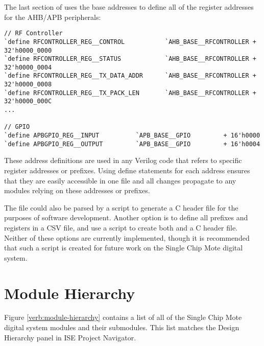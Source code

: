 The last section of  uses the base addresses to define all of the register addresses for the AHB/APB peripherals:

\begin{lstlisting}
// RF Controller
`define RFCONTROLLER_REG__CONTROL           `AHB_BASE__RFCONTROLLER + 32'h0000_0000
`define RFCONTROLLER_REG__STATUS            `AHB_BASE__RFCONTROLLER + 32'h0000_0004
`define RFCONTROLLER_REG__TX_DATA_ADDR      `AHB_BASE__RFCONTROLLER + 32'h0000_0008
`define RFCONTROLLER_REG__TX_PACK_LEN       `AHB_BASE__RFCONTROLLER + 32'h0000_000C
...

// GPIO
`define APBGPIO_REG__INPUT          `APB_BASE__GPIO         + 16'h0000
`define APBGPIO_REG__OUTPUT         `APB_BASE__GPIO         + 16'h0004

\end{lstlisting}

These address definitions are used in any Verilog code that refers to specific register addresses or prefixes. Using define statements for each address ensures that they are easily accessible in one file and all changes propagate to any modules relying on these addresses or prefixes.

The  file could also be parsed by a script to generate a C header file for the purposes of software development. Another option is to define all prefixes and registers in a CSV file, and use a script to create both  and a C header file. Neither of these options are currently implemented, though it is recommended that such a script is created for future work on the Single Chip Mote digital system. %

\section{Module Hierarchy}
Figure \ref{verb:module-hierarchy} contains a list of all of the Single Chip Mote digital system modules and their submodules. This list matches the Design Hierarchy panel in ISE Project Navigator.

